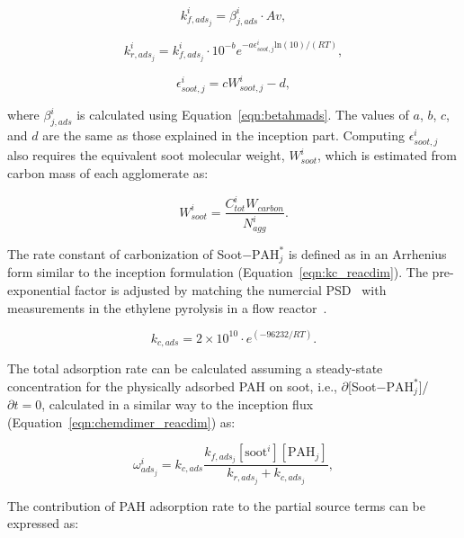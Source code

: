 \begin{equation}
	k^i_{f,ads_j}=\beta^i_{j,ads}\cdot Av,
	\label{eqn:kfads_reacdim}
\end{equation}

\begin{equation}
	k^i_{r,ads_j}=k^i_{f,ads_j}\cdot10^{-b}e^{-a\epsilon^i_{soot,j} \mathrm{ln}(10)/(RT)},
	\label{eqn:krads_reacdim}
\end{equation}

\begin{equation}
	\epsilon^i_{soot,j} = cW^i_{soot,j} - d,
	\label{eqn:epsilonads_reacdim}
\end{equation}

\noindent where $\beta^i_{j,ads}$ is calculated using Equation~\eqref{eqn:betahmads}. The values of $a$, $b$, $c$, and $d$ are the same as those explained in the inception part. Computing ${\epsilon^i_{soot,j}}$ also requires the equivalent soot molecular weight, ${W^i_{soot}}$, which is estimated from carbon mass of each agglomerate as:

\begin{equation}
	W^i_{soot}=\frac{C^i_{tot}W_{carbon}}{N^i_{agg}}.
\end{equation}

The rate constant of carbonization of Soot$-$$\mathrm{PAH}^*_j$ is defined as in an Arrhenius form similar to the inception formulation (Equation~\eqref{eqn:kc_reacdim}). The pre-exponential factor is adjusted by matching the numercial PSD~\citep{naseri2022simulating} with measurements in the ethylene pyrolysis in a flow reactor~\cite{araki2021effects}. 

\begin{equation}
	k_{c,ads} = 2\times10^{10}\cdot e^{(-96232/RT)}
	\label{eqn:kcads_reacdim}.
\end{equation}


The total adsorption rate can be calculated assuming a steady-state concentration for the physically adsorbed PAH on soot, i.e., $\partial$[Soot$-\mathrm{PAH}^*_j$]/$\partial t=0$, calculated in a similar way to the inception flux (Equation~\eqref{eqn:chemdimer_reacdim}) as:

\begin{equation}
	\omega^i_{ads_j} = k_{c,ads}\frac{k_{f,ads_j}[\mathrm{soot}^i][\mathrm{PAH}_j]}{k_{r,ads_j}+k_{c,ads_j}}
	\label{eqn:wads_reacdim},
\end{equation}

The contribution of PAH adsorption rate to the partial source terms can be expressed as:

